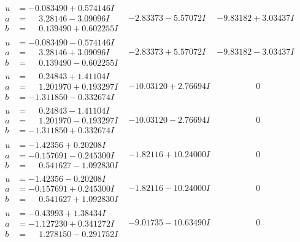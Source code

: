 \documentclass[1p]{elsarticle_modified}
\theoremstyle{definition}
\begin{document}
$$\begin{array}{c|c|c}
\begin{aligned}
u &= -0.083490 + 0.574146 I \\
a &= \phantom{-}3.28146 - 3.09096 I \\
b &= \phantom{-}0.139490 + 0.602255 I\end{aligned}
 & -2.83373 - 5.57072 I & -9.83182 + 3.03437 I \\ \hline\begin{aligned}
u &= -0.083490 - 0.574146 I \\
a &= \phantom{-}3.28146 + 3.09096 I \\
b &= \phantom{-}0.139490 - 0.602255 I\end{aligned}
 & -2.83373 + 5.57072 I & -9.83182 - 3.03437 I \\ \hline\begin{aligned}
u &= \phantom{-}0.24843 + 1.41104 I \\
a &= \phantom{-}1.201970 + 0.193297 I \\
b &= -1.311850 - 0.332674 I\end{aligned}
 & -10.03120 + 2.76694 I & \phantom{-0.000000 } 0 \\ \hline\begin{aligned}
u &= \phantom{-}0.24843 - 1.41104 I \\
a &= \phantom{-}1.201970 - 0.193297 I \\
b &= -1.311850 + 0.332674 I\end{aligned}
 & -10.03120 - 2.76694 I & \phantom{-0.000000 } 0 \\ \hline\begin{aligned}
u &= -1.42356 + 0.20208 I \\
a &= -0.157691 - 0.245300 I \\
b &= \phantom{-}0.541627 - 1.092830 I\end{aligned}
 & -1.82116 + 10.24000 I & \phantom{-0.000000 } 0 \\ \hline\begin{aligned}
u &= -1.42356 - 0.20208 I \\
a &= -0.157691 + 0.245300 I \\
b &= \phantom{-}0.541627 + 1.092830 I\end{aligned}
 & -1.82116 - 10.24000 I & \phantom{-0.000000 } 0 \\ \hline\begin{aligned}
u &= -0.43993 + 1.38434 I \\
a &= -1.127230 + 0.341272 I \\
b &= \phantom{-}1.278150 - 0.291752 I\end{aligned}
 & -9.01735 - 10.63490 I & \phantom{-0.000000 } 0 \\ \hline\begin{aligned}

\end{aligned}
\end{array}$$
\end{document}
